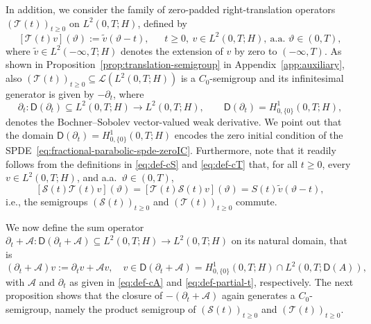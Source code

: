 \documentclass[reqno]{amsart}
\numberwithin{equation}{section}
\newcommand{\cA}{\mathcal{A}}
\newcommand{\cS}{\mathcal{S}}
\newcommand{\cT}{\mathcal{T}}
\newcommand{\from}{\colon}
\theoremstyle{remark}
\theoremstyle{definition}
\begin{document}
In addition, 
we consider the family of zero-padded 
right-translation operators 
$(\cT(t))_{t\geq 0}$ on $L^2(0,T; H)$, defined by
% 
\begin{equation}\label{eq:def-cT} 
[\cT(t)v](\vartheta) 
:= 
\widetilde v(\vartheta - t), 
\quad\;\;   
t\geq 0, 
\ 
v \in L^2(0,T; H), 
\ 
\text{a.a.\ }\vartheta \in (0,T),
\end{equation}
%
where $\widetilde v \in L^2(-\infty,T;H)$ 
denotes the extension 
of $v$ by zero to $(-\infty,T)$. 
% 
As shown in Proposition~\ref{prop:translation-semigroup} 
in Appendix~\ref{app:auxiliary}, 
also $(\cT(t))_{t\geq 0} \subseteq \mathscr L(L^2(0,T;H))$ 
is a $C_0$-semigroup 
and its infinitesimal generator 
is given by $-\partial_t$, 
where 
% 
\begin{equation}\label{eq:def-partial-t} 
\partial_t \from \mathsf D(\partial_t) \subseteq L^2(0,T;H) \to L^2(0,T;H), 
\qquad 
\mathsf D(\partial_t) = H^1_{0,\{0\}}(0,T; H), 
\end{equation} 
%  
denotes the Bochner--Sobolev 
vector-valued weak derivative. 
%
We point out that the domain 
$\mathsf D(\partial_t)= H^1_{0,\{0\}}(0,T; H)$ 
encodes the zero initial condition 
of the SPDE~\eqref{eq:fractional-parabolic-spde-zeroIC}.
%
Furthermore, note that 
it readily follows 
from the definitions in 
\eqref{eq:def-cS} and \eqref{eq:def-cT} that, 
for all $t\geq 0$,  
every $ v \in L^2(0,T;H)$, 
and a.a.\ $\vartheta \in (0,T)$,
% 
\[ 
[\cS(t) \cT(t)v](\vartheta) 
= 
[\cT(t) \cS(t)v](\vartheta) 
= 
S(t) \widetilde v(\vartheta-t), 
\] 
%
i.e., the semigroups $(\cS(t))_{t\geq 0}$ 
and $(\cT(t))_{t\geq 0}$ commute.

We now define the sum operator 
$\partial_t + \cA 
\from 
\mathsf D(\partial_t+\cA)\subseteq L^2(0,T;H) 
\to L^2(0,T;H)$ 
on its natural domain, that is 
%
\begin{equation}\label{eq:sum-operator} 
( \partial_t+ \cA)v 
:= 
\partial_t v + \cA v, 
\quad 
v\in \mathsf D(\partial_t + \cA) 
= H^1_{0,\{0\}}(0,T; H) \cap L^2(0,T; \mathsf D(A)), 
\end{equation}
%
with $\cA$ and $\partial_t$ 
as given in \eqref{eq:def-cA} 
and \eqref{eq:def-partial-t}, respectively. 
%
The next proposition shows that 
the closure of $-(\partial_t + \cA)$ 
again generates a $C_0$-semigroup, 
namely the product semigroup 
of $(\cS(t))_{t\geq 0}$ and $(\cT(t))_{t\geq 0}$. 
\end{document}
